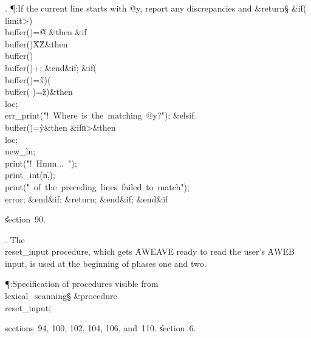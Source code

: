 . \P\?:If the current line starts with \.{@y}, report any discrepancies
and \&{return}\X\S\?\6
\&{if}\1\1\?\8\1(\?\\{limit}\?>\?\2)\ANT\?\\{buffer}\?\1(\?\2)=\?\H{@}\2%
\8\&{then}\6
\&{if}\1\1\8\\{buffer}\?\1(\?\2)\in\?\H{X}\?\to\?\H{Z}\2\8\&{then}\6
\\{buffer}\?\1(\?\2)\K\?\\{buffer}\?\1(\?\2)+\?;%
\2\6
\&{end}\8\2\&{if}\1;\6
\&{if}\1\1\?\8\1(\?\\{buffer}\?\1(\?\2)=\?\H{x}\?\2)\V\1(\?\\{buffer}\?\1(%
\?\2)=\?\H{z}\?\2)\?\2\8\&{then}\6
\\{loc}\?\K{};\5
\\{err\_print}\?\1(\?\.{"!\ Where\ is\ the\ matching\ @y?"}\?\2)\?;\6
\4\&{elsif}\1\8\\{buffer}\?\1(\?\2)=\?\H{y}\2\8\&{then}\6
\&{if}\1\1\8\|n\?>\2\8\&{then}\6
\\{loc}\?\K{};\5
\\{new\_ln};\5
\\{print}\?\1(\?\.{"!\ Hmm...\ "}\?\2)\?;\5
\\{print\_int}\?\1(\?\|n\?,\?\2)\?;\5
\\{print}\?\1(\?\.{"\ of\ the\ preceding\ lines\ failed\ to\ match"}\?\2)\?;\5
\\{error};\2\6
\&{end}\8\2\&{if}\1;\6
\&{return};\2\6
\&{end}\8\2\&{if}\1;\2\6
\&{end}\8\2\&{if}\1\par
\U section~90.\fi

. The \\{reset\_input} procedure, which gets \.{AWEAVE} ready to read the
user's \.{AWEB} input, is used at the beginning of phases one and two.

\Y\P\?\4:Specification of procedures visible from \\{lexical\_scanning}\X\S%
\?\6
\&{procedure}\8\1\\{reset\_input}\2;\par
\A sections~94, 100, 102, 104, 106, and~110.
\U section~6\*.\fi

